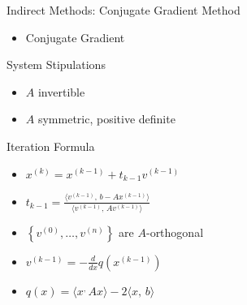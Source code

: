 \documentclass[9pt, serif]{beamer}
\newlength{\wideitemsep}
\let\olditem\item
\renewcommand{\item}{\setlength{\itemsep}{\wideitemsep}\olditem}
\newcommand{\bi}{\begin{itemize}}
\newcommand{\ei}{\end{itemize}}
\begin{document}
\begin{frame}{Indirect Methods: Conjugate Gradient}
    Method
    \bi
        \item Conjugate Gradient
    \ei
    System Stipulations
    \bi
        \item $A$ invertible
        \item $A$ symmetric, positive definite
    \ei
    Iteration Formula
    \bi
        \item $x^{(k)} = x^{(k-1)}+t_{k-1}v^{(k-1)}$
        \item $t_{k-1} = \frac{\langle v^{(k-1)},\, b - Ax^{(k-1)}\rangle}{\langle v^{(k-1)},\, Av^{(k-1)} \rangle}$
        \item $\left\{v^{(0)},\ldots,v^{(n)}\right\}$ are $A$-orthogonal
        \item $v^{(k-1)} = -\frac{d}{dx} q(x^{(k-1)})$
        \item $q(x) = \langle x^,\, Ax \rangle - 2 \langle x,\, b \rangle$
    \ei
\end{frame}
\end{document}

